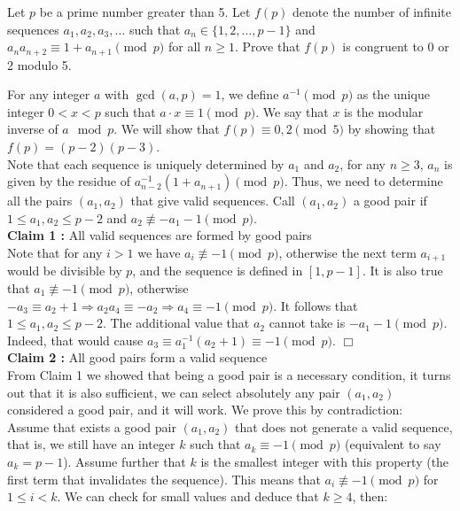 \begin{problem}[N][6][Putnam 2022/A3]
    Let \( p \) be a prime number greater than 5. Let \( f(p) \) denote the number of infinite sequences \( a_1, a_2, a_3, \dots \) such that  \( a_n \in \{1,2,\dots, p-1\} \) and  \( a_n a_{n+2} \equiv 1 + a_{n+1} \pmod{p} \) for all \( n \geq 1 \). Prove that \( f(p) \) is congruent to 0 or 2 modulo 5.
    \end{problem}

\begin{solution}
    For any integer $a$ with $\gcd(a,p)=1$, we define $a^{-1} \pmod p$ as the unique integer $0 <x < p$ such that $a \cdot x \equiv 1 \pmod p$. We say that $x$ is the modular inverse of $a \mod p$. 
    We will show that $f(p) \equiv 0,2 \pmod{5}$ by showing that $f(p) = (p-2)(p-3)$.\\[2mm]
    Note that each sequence is uniquely determined by $a_1$ and $a_2$, for any $n \geq 3$, $a_n$ is given by the residue of $a_{n-2}^{-1} (1 + a_{n+1}) \pmod p$. Thus, we need to determine all the pairs $(a_1,a_2)$ that give valid sequences. Call $(a_1,a_2)$ a good pair if $1 \leq a_1, a_2 \leq p-2$ and $a_2 \not \equiv -a_1-1 \pmod p$.\\[2mm]
    \textbf{Claim 1 :} All valid sequences are formed by good pairs \\[1mm]
        Note that for any $i > 1$ we have $a_i \not \equiv -1 \pmod p$, otherwise the next term $a_{i+1}$ would be divisible by $p$,  and the sequence is defined in $[1,p-1]$. It is also true that $a_1 \not \equiv -1 \pmod p$, otherwise $-a_3 \equiv a_2 + 1 \Rightarrow a_2a_4 \equiv -a_2 \Rightarrow a_4 \equiv -1 \pmod p$. It follows that $1 \leq a_1, a_2 \leq p-2$. The additional value that $a_2$ cannot take is $-a_1 -1 \pmod{p}$. Indeed, that would cause $a_3 \equiv a_1^{-1}(a_2+1) \equiv -1 \pmod p$. $\Box$ \\[2mm]
    \textbf{Claim 2 :} All good pairs form a valid sequence \\[1mm]
        From Claim 1 we showed that being a good pair is a necessary condition, it turns out that it is also sufficient, we can select absolutely any pair $(a_1,a_2)$ considered a good pair, and it will work. We prove this by contradiction: \\
        Assume that exists a good pair $(a_1,a_2)$ that does not generate a valid sequence, that is, we still have an integer $k$ such that $a_k \equiv -1 \pmod p$ (equivalent to say $a_k = p-1$). Assume further that $k$ is the smallest integer with this property (the first term that invalidates the sequence). This means that $a_i \not \equiv -1 \pmod p$ for $1 \leq i < k$. We can check for small values and deduce that $k \geq 4$, then:

\end{solution}
